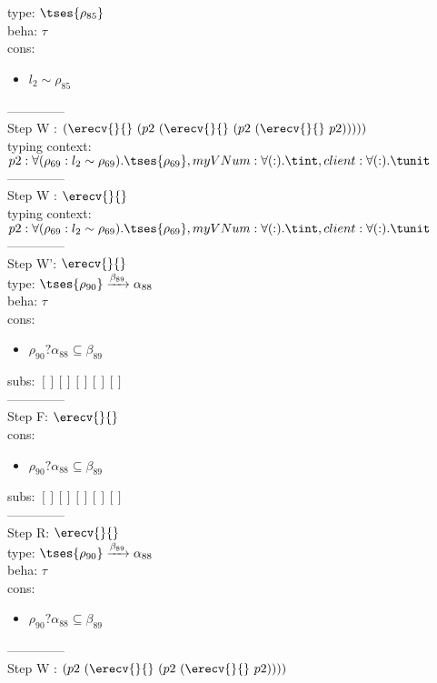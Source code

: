 \documentclass[12pt]{article}
\begin{document}
  type: $  \tses{ \rho_{85}} $ 
\\  beha: $ \tau $ 
\\  cons: \begin{itemize}
\item $ l_{2} \sim\rho_{85} $
\end{itemize} 
  --------------\\ 
Step W : $ (\erecv{}{}~(p2~(\erecv{}{}~(p2~(\erecv{}{}~p2))))) $\\
 typing context: $ p2:\forall (\rho_{69} : l_{2} \sim\rho_{69}).  \tses{ \rho_{69}}, myVNum:\forall ( : ). \tint, client:\forall ( : ). \tunit$ 
\\ --------------\\
Step W : $ \erecv{}{} $\\
 typing context: $ p2:\forall (\rho_{69} : l_{2} \sim\rho_{69}).  \tses{ \rho_{69}}, myVNum:\forall ( : ). \tint, client:\forall ( : ). \tunit$ 
\\ --------------\\
Step W': $ \erecv{}{} $\\
  type: $  \tses{ \rho_{90}} \xrightarrow{\beta_{89}} \alpha_{88} $ 
\\  beha: $ \tau $ 
\\  cons: \begin{itemize}
\item $ \rho_{90}?\alpha_{88} \subseteq \beta_{89} $
\end{itemize} 
  subs:  $ [ ] [] [] [] [] $  
 \\--------------\\ 
Step F: $ \erecv{}{} $
 \\ cons: \begin{itemize}
\item $ \rho_{90}?\alpha_{88} \subseteq \beta_{89} $
\end{itemize}
 subs:  $ [ ] [] [] [] [] $ 
  \\--------------\\ 
Step R: $ \erecv{}{} $\\
  type: $  \tses{ \rho_{90}} \xrightarrow{\beta_{89}} \alpha_{88} $ 
\\  beha: $ \tau $ 
\\  cons: \begin{itemize}
\item $ \rho_{90}?\alpha_{88} \subseteq \beta_{89} $
\end{itemize} 
  --------------\\ 
Step W : $ (p2~(\erecv{}{}~(p2~(\erecv{}{}~p2)))) $\\
\end{document}
